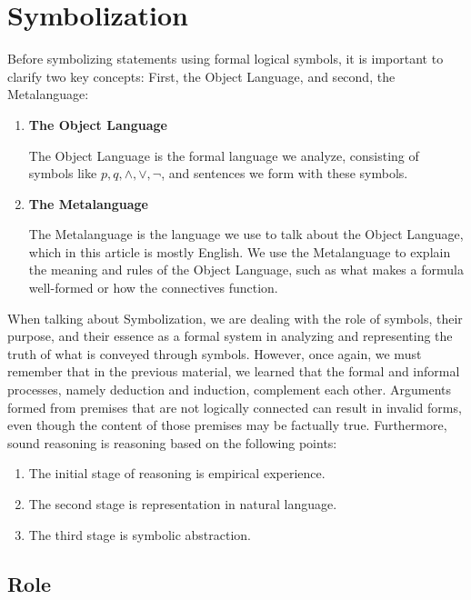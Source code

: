 \documentclass[12pt,a4paper,openany]{article}
\begin{document}
\section{Symbolization}

Before symbolizing statements using formal logical symbols, it is
important to clarify two key concepts: First, the Object Language, and
second, the Metalanguage:

\begin{enumerate}
\item \textbf{The Object Language}

The Object Language is the formal language we analyze, consisting
of symbols like \(p, q, \wedge, \vee, \neg\), and sentences we form with
these symbols.

\item \textbf{The Metalanguage}

The Metalanguage is the language we use to talk about the Object
Language, which in this article is mostly English. We use the
Metalanguage to explain the meaning and rules of the Object Language,
such as what makes a formula well-formed or how the connectives function.
\end{enumerate}

When talking about Symbolization, we are dealing with the role of
symbols, their purpose, and their essence as a formal system in
analyzing and representing the truth of what is conveyed through
symbols. However, once again, we must remember that in the previous
material, we learned that the formal and informal processes, namely
deduction and induction, complement each other. Arguments formed from
premises that are not logically connected can result in invalid forms,
even though the content of those premises may be factually true.
Furthermore, sound reasoning is reasoning based on the following points:

\begin{enumerate}
\item The initial stage of reasoning is empirical experience.
\item The second stage is representation in natural language.
\item The third stage is symbolic abstraction.
\end{enumerate}

\subsection{Role}\label{role}
\end{document}
